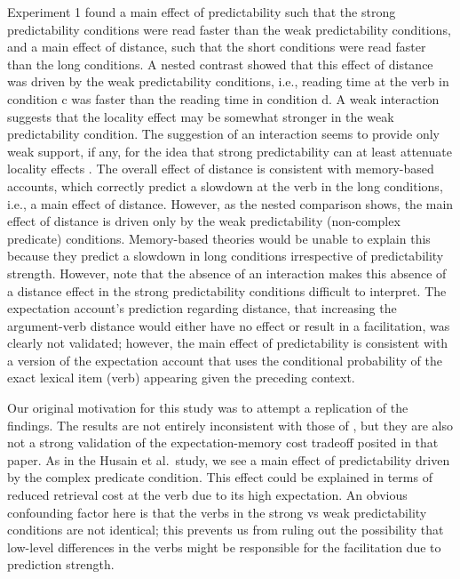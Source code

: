 \documentclass{frontiersSCNS}\usepackage{knitr} %
\begin{document}
Experiment 1 found a main effect of predictability such that the strong predictability conditions were read faster than the weak predictability conditions, and a main effect of distance, such that the short conditions were read faster than the long conditions. A nested contrast showed that this effect of distance was driven by the weak predictability conditions, i.e., reading time at the verb in condition c was faster than the reading time in condition d. A weak interaction suggests that the locality effect may be somewhat stronger in the weak predictability condition. The suggestion of an interaction seems to provide only weak support, if any, for the idea that strong predictability can at least attenuate locality effects \citep{husain2014strong}.
The overall effect of distance is consistent with memory-based accounts, which correctly predict a slowdown at the verb in the long conditions, i.e., a main effect of distance. However, as the nested comparison shows, the main effect of distance is driven only by the weak predictability (non-complex predicate) conditions. Memory-based theories would be unable to explain this because they predict a slowdown in long conditions irrespective of predictability strength. However, note
that the absence of an interaction makes this absence of
a distance effect in the strong predictability conditions difficult to interpret.
The expectation account's prediction regarding distance, that increasing the argument-verb distance would either have no effect or result in a facilitation, was clearly not validated; however, the main effect of predictability is consistent with a version of the expectation account that uses the conditional probability of the exact lexical item (verb) appearing given the preceding context.

Our original motivation for this study was to attempt a replication of the \cite{husain2014strong} findings.  
The results are not entirely inconsistent with those of \cite{husain2014strong}, but they are also not a strong validation of the expectation-memory cost tradeoff posited in that paper. As in the Husain et al.\ study, we see a main effect of predictability driven by the complex predicate condition. This effect could be explained in terms of reduced retrieval cost at the verb due to its high expectation. An  obvious confounding factor here is that the verbs in the strong vs weak predictability conditions are not identical; this prevents us from ruling out the possibility that low-level differences in the verbs might be responsible for the facilitation due to prediction strength.
\end{document}
